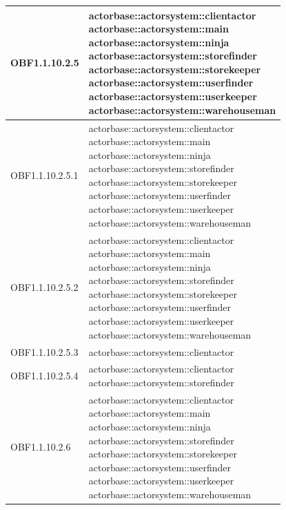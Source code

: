 \documentclass{scalatekids-article}
\begin{document}
\begin{longtable}[H]{|p{6cm}|p{11cm}|}
\hline
OBF1.1.10.2.5 & \multiLineCell[t]{actorbase::actorsystem::clientactor\\actorbase::actorsystem::main\\actorbase::actorsystem::ninja\\actorbase::actorsystem::storefinder\\actorbase::actorsystem::storekeeper\\actorbase::actorsystem::userfinder\\actorbase::actorsystem::userkeeper\\actorbase::actorsystem::warehouseman\\}\\
\hline
OBF1.1.10.2.5.1 & \multiLineCell[t]{actorbase::actorsystem::clientactor\\actorbase::actorsystem::main\\actorbase::actorsystem::ninja\\actorbase::actorsystem::storefinder\\actorbase::actorsystem::storekeeper\\actorbase::actorsystem::userfinder\\actorbase::actorsystem::userkeeper\\actorbase::actorsystem::warehouseman\\}\\
\hline
OBF1.1.10.2.5.2 & \multiLineCell[t]{actorbase::actorsystem::clientactor\\actorbase::actorsystem::main\\actorbase::actorsystem::ninja\\actorbase::actorsystem::storefinder\\actorbase::actorsystem::storekeeper\\actorbase::actorsystem::userfinder\\actorbase::actorsystem::userkeeper\\actorbase::actorsystem::warehouseman\\}\\
\hline
OBF1.1.10.2.5.3 & \multiLineCell[t]{actorbase::actorsystem::clientactor\\}\\
\hline
OBF1.1.10.2.5.4 & \multiLineCell[t]{actorbase::actorsystem::clientactor\\actorbase::actorsystem::storefinder\\}\\
\hline
OBF1.1.10.2.6 & \multiLineCell[t]{actorbase::actorsystem::clientactor\\actorbase::actorsystem::main\\actorbase::actorsystem::ninja\\actorbase::actorsystem::storefinder\\actorbase::actorsystem::storekeeper\\actorbase::actorsystem::userfinder\\actorbase::actorsystem::userkeeper\\actorbase::actorsystem::warehouseman\\}\\

\end{longtable}
\end{document}
